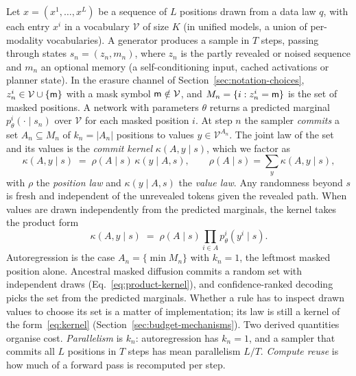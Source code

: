 Let $x=(x^1,\dots,x^L)$ be a sequence of $L$ positions drawn from a data law $q$, with each entry $x^i$ in a vocabulary $\mathcal V$ of size $K$ (in unified models, a union of per-modality vocabularies). A generator produces a sample in $T$ steps, passing through states $s_n=(z_n,m_n)$, where $z_n$ is the partly revealed or noised sequence and $m_n$ an optional memory (a self-conditioning input, cached activations or planner state). In the erasure channel of Section~\ref{sec:notation-choices}, $z_n^i\in\mathcal V\cup\{\mathsf{m}\}$ with a mask symbol $\mathsf{m}\notin\mathcal V$, and $M_n=\{i:z_n^i=\mathsf{m}\}$ is the set of masked positions. A network with parameters $\theta$ returns a predicted marginal $p_\theta^i(\cdot\mid s_n)$ over $\mathcal V$ for each masked position $i$. At step $n$ the sampler \emph{commits} a set $A_n\subseteq M_n$ of $k_n=|A_n|$ positions to values $y\in\mathcal V^{A_n}$. The joint law of the set and its values is the \emph{commit kernel} $\kappa(A,y\mid s)$, which we factor as
\begin{equation}
  \kappa(A,y\mid s)\;=\;\rho(A\mid s)\,\kappa(y\mid A,s),
  \qquad \rho(A\mid s)=\sum_{y}\kappa(A,y\mid s),
  \label{eq:kernel}
\end{equation}
with $\rho$ the \emph{position law} and $\kappa(y\mid A,s)$ the \emph{value law}. Any randomness beyond $s$ is fresh and independent of the unrevealed tokens given the revealed path. %
When values are drawn independently from the predicted marginals, the kernel takes the product form
\begin{equation}
  \kappa(A,y\mid s)\;=\;\rho(A\mid s)\prod_{i\in A}p_\theta^i(y^i\mid s).
  \label{eq:product-kernel}
\end{equation}
Autoregression is the case $A_n=\{\min M_n\}$ with $k_n=1$, the leftmost masked position alone. Ancestral masked diffusion commits a random set with independent draws (Eq.~\eqref{eq:product-kernel}), and confidence-ranked decoding picks the set from the predicted marginals. Whether a rule has to inspect drawn values to choose its set is a matter of implementation; its law is still a kernel of the form~\eqref{eq:kernel} (Section~\ref{sec:budget-mechanisms}).
Two derived quantities organise cost. \emph{Parallelism} is $k_n$: autoregression has $k_n=1$, and a sampler that commits all $L$ positions in $T$ steps has mean parallelism $L/T$. \emph{Compute reuse} is how much of a forward pass is recomputed per step. %

